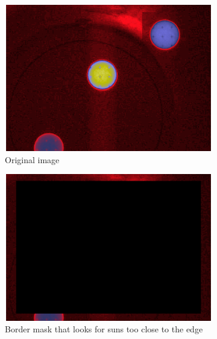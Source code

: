 \documentclass[10pt]{scrartcl}
\begin{document}
\begin{figure}[!ht]
    \centering
   \begin{subfigure}{.49\textwidth}
        \centering
        \includegraphics[width=1.\textwidth]{../plots_tables_images/inputimage.eps}
        \caption{Original image}
        \label{og_image}
    \end{subfigure}
    \begin{subfigure}{.49\textwidth}
        \centering
        \includegraphics[width=1.\textwidth]{../plots_tables_images/beforezero.eps}
        \caption{Border mask that looks for suns too close to the edge}
    \end{subfigure}
    \begin{subfigure}{.49\textwidth}
        \centering

\end{subfigure}
\end{figure}
\end{document}
